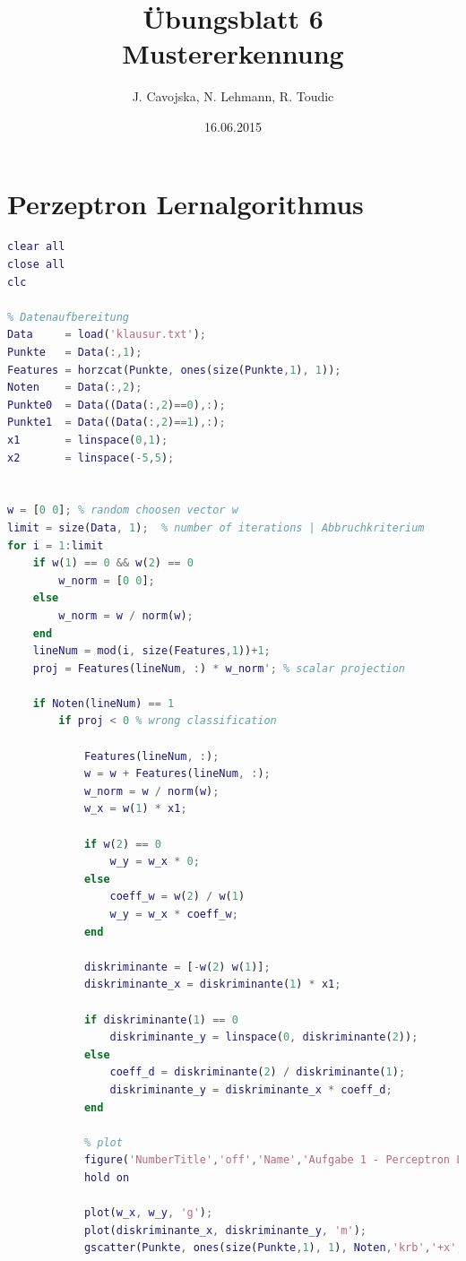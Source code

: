 \documentclass[12pt]{article}
\title{\"Ubungsblatt 6\\ \glqq Mustererkennung\grqq}
\author{J. Cavojska, N. Lehmann, R. Toudic}
\date{16.06.2015}
\begin{document}
\maketitle
\tableofcontents
\newpage

\section{Perzeptron Lernalgorithmus}

\begin{lstlisting}[language=Matlab]
% Clean up
clear all
close all
clc

% Datenaufbereitung
Data     = load('klausur.txt');
Punkte   = Data(:,1);
Features = horzcat(Punkte, ones(size(Punkte,1), 1));
Noten    = Data(:,2);
Punkte0  = Data((Data(:,2)==0),:);
Punkte1  = Data((Data(:,2)==1),:);
x1       = linspace(0,1);
x2       = linspace(-5,5);


w = [0 0]; % random choosen vector w
limit = size(Data, 1);  % number of iterations | Abbruchkriterium
for i = 1:limit
    if w(1) == 0 && w(2) == 0
        w_norm = [0 0];
    else
        w_norm = w / norm(w);
    end
    lineNum = mod(i, size(Features,1))+1;
    proj = Features(lineNum, :) * w_norm'; % scalar projection
    
    if Noten(lineNum) == 1
        if proj < 0 % wrong classification
            
            Features(lineNum, :);
            w = w + Features(lineNum, :);
            w_norm = w / norm(w);
            w_x = w(1) * x1;
            
            if w(2) == 0
                w_y = w_x * 0;
            else
                coeff_w = w(2) / w(1)
                w_y = w_x * coeff_w;
            end
            
            diskriminante = [-w(2) w(1)];
            diskriminante_x = diskriminante(1) * x1;
            
            if diskriminante(1) == 0
                diskriminante_y = linspace(0, diskriminante(2));
            else
                coeff_d = diskriminante(2) / diskriminante(1);
                diskriminante_y = diskriminante_x * coeff_d;
            end
            
            % plot
            figure('NumberTitle','off','Name','Aufgabe 1 - Perceptron Learning');
            hold on            
            
            plot(w_x, w_y, 'g');
            plot(diskriminante_x, diskriminante_y, 'm');
            gscatter(Punkte, ones(size(Punkte,1), 1), Noten,'krb','+x',[],'off');
                        

\end{lstlisting}
\end{document}
